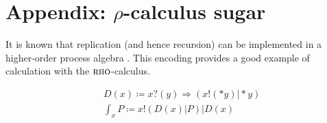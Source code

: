 \documentclass[]{acm_proc_article-sp}
\newcommand{\lpquote}{\ulcorner}
\newcommand{\rpquote}{\urcorner}
\newcommand{\id}[1]{\texttt{#1}}
\newcommand{\juxtap}{\mathbin{\id{|}}}
\newcommand{\concat}{\Rightarrow}
\newcommand{\binpar}[2]{#1 \juxtap #2}
\newcommand{\outputp}[2]{#1 ! ( * #2 )}
\newcommand{\prefix}[3]{#1 ? ( #2 ) \concat #3}
\newcommand{\lift}[2]{#1 ! ( #2 )}
\newcommand{\dropn}[1]{*#1}
\newcommand{\xbangp}[2]{\int_{#2} #1}
\newcommand{\defneqls}{\coloneqq}
\numberwithin{equation}{subsection}
\newcommand{\rhoc}{${\textsc{rho}}$-calculus}
\begin{document}

\section{Appendix: $\rho$-calculus sugar}

It is known that replication (and hence recursion) can be implemented
in a higher-order process algebra \cite{SangiorgiWalker}. This
encoding provides a good example of calculation with the {\rhoc}.


\begin{equation*}
  \begin{aligned}
    & D(x) \defneqls \prefix{x}{y}{(\binpar{\outputp{x}{y}}{\dropn{y}})} \\
    & \xbangp{P}{x} \defneqls \binpar{\lift{x}{\binpar{D(x)}{P}}}{D(x)} \\
  \end{aligned}
\end{equation*}
\end{document}
